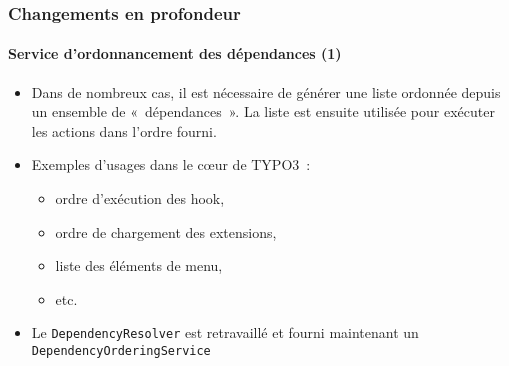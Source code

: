 \begin{frame}[fragile]
	\frametitle{Changements en profondeur}
	\framesubtitle{Service d'ordonnancement des dépendances (1)}

	\begin{itemize}

		\item Dans de nombreux cas, il est nécessaire de générer une liste ordonnée depuis un ensemble de
			«~dépendances~».
			La liste est ensuite utilisée pour exécuter les actions dans l'ordre fourni.

		\item Exemples d'usages dans le cœur de TYPO3~:

			\begin{itemize}
				\item ordre d'exécution des hook,
				\item ordre de chargement des extensions,
				\item liste des éléments de menu,
				\item etc.
			\end{itemize}

		\item Le \texttt{DependencyResolver} est retravaillé et fourni
			maintenant un \texttt{DependencyOrderingService}

	\end{itemize}

\end{frame}


